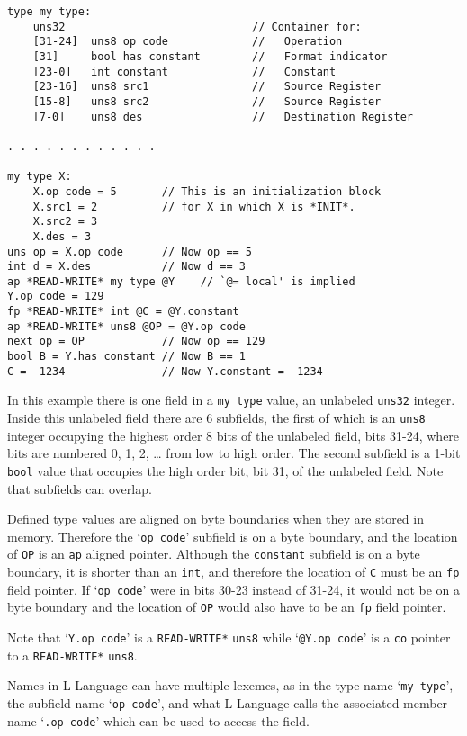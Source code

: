\documentclass[12pt]{article}
\newenvironment{indpar}[1][0.3in]%
	{\begin{list}{}%
		     {\setlength{\itemsep}{0in}%
		      \setlength{\topsep}{0in}%
		      \setlength{\parsep}{1ex}%
		      \setlength{\labelwidth}{#1}%
		      \setlength{\leftmargin}{#1}%
		      \addtolength{\leftmargin}{\labelsep}}%
	 \item}%
	{\end{list}}
\begin{document}
\begin{indpar}\begin{verbatim}
type my type:
    uns32                             // Container for:
    [31-24]  uns8 op code             //   Operation
    [31]     bool has constant        //   Format indicator
    [23-0]   int constant             //   Constant
    [23-16]  uns8 src1                //   Source Register
    [15-8]   uns8 src2                //   Source Register
    [7-0]    uns8 des                 //   Destination Register

. . . . . . . . . . . .

my type X:
    X.op code = 5       // This is an initialization block
    X.src1 = 2          // for X in which X is *INIT*.
    X.src2 = 3
    X.des = 3
uns op = X.op code      // Now op == 5
int d = X.des           // Now d == 3
ap *READ-WRITE* my type @Y    // `@= local' is implied
Y.op code = 129
fp *READ-WRITE* int @C = @Y.constant
ap *READ-WRITE* uns8 @OP = @Y.op code
next op = OP            // Now op == 129
bool B = Y.has constant // Now B == 1
C = -1234               // Now Y.constant = -1234
\end{verbatim}\end{indpar}

In this example there is one field in a {\tt my type} value,
an unlabeled {\tt uns32} integer.
Inside this unlabeled field there are 6 subfields, the first of which is
an {\tt uns8} integer occupying the highest order 8
bits of the unlabeled field, bits 31-24,
where bits are numbered 0, 1, 2, \ldots{} from
low to high order.  The second subfield is a 1-bit {\tt bool}
value that occupies the high order bit, bit 31, of the unlabeled field.
Note that subfields can overlap.

Defined type values are aligned on byte boundaries when
they are stored in memory.  Therefore the `{\tt op code}' subfield
is on a byte boundary, and
the location of {\tt OP} is an {\tt ap} aligned pointer.  Although
the {\tt constant} subfield is on a byte boundary, it is
shorter than an {\tt int}, and therefore the
location of {\tt C} must be an {\tt fp} field pointer.
If `{\tt op code}' were in bits 30-23 instead of 31-24, it would
not be on a byte boundary and the location of {\tt OP} would
also have to be an {\tt fp} field pointer.

Note that `{\tt Y.op code}' is a {\tt *READ-WRITE*}
{\tt uns8} while `{\tt @Y.op code}' is a {\tt co} pointer to
a {\tt *READ-WRITE*} {\tt uns8}.

Names in L-Language can have multiple lexemes, as in
the type name `{\tt my type}', the subfield name `{\tt op code}',
and what L-Language calls the
associated member name `{\tt .op code}' which can be used to access
the field.
\end{document}
